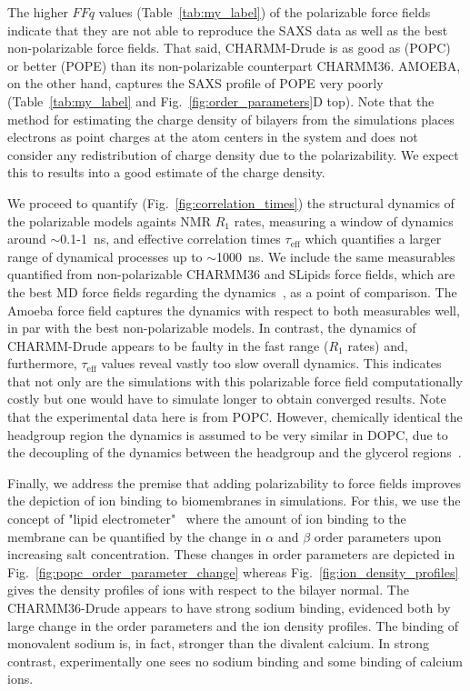 \documentclass[journal=jacsat,manuscript=article,layout=singlecolumn]{achemso}
\begin{document}
The higher $FFq$ values (Table~\ref{tab:my_label}) of the polarizable force fields indicate that they are not able to reproduce the SAXS data as well as the best non-polarizable force fields. That said, CHARMM-Drude is as good as (POPC) or better (POPE) than its non-polarizable counterpart CHARMM36. AMOEBA, on the other hand, captures the SAXS profile of POPE very poorly (Table~\ref{tab:my_label} and Fig.~\ref{fig:order_parameters}D top). Note that the method for estimating the charge density of bilayers from the simulations places electrons as point charges at the atom centers in the system and does not consider any redistribution of charge density due to the polarizability. We expect this to results into a good estimate of the charge density.

We proceed to quantify (Fig.~\ref{fig:correlation_times}) the structural dynamics of the polarizable models againts NMR $R_{1}$ rates, measuring a window of dynamics around $\sim$0.1-1~ns, and effective correlation times $\tau_{\mathrm{eff}}$ which quantifies a larger range of dynamical processes up to $\sim$1000~ns. We include the same measurables quantified from non-polarizable CHARMM36 and SLipids force fields, which are the best MD force fields regarding the dynamics~\cite{Antila2021}, as a point of comparison. The Amoeba force field captures the dynamics with respect to both measurables well,  in par with the best non-polarizable models. In contrast, the dynamics of CHARMM-Drude appears to be faulty in the fast range ($R_{1}$ rates) and, furthermore, $\tau_{\mathrm{eff}}$ values reveal vastly too slow overall dynamics. This indicates that not only are the simulations with this polarizable force field computationally costly but one would have to simulate longer to obtain converged results. Note that the experimental data here is from POPC. However, chemically identical the headgroup region the dynamics is assumed to be very similar in DOPC, due to the decoupling of the dynamics between the headgroup and the glycerol regions~\cite{Antila2022rot, Klauda08}.

Finally, we address the premise that adding polarizability to force fields improves the depiction of ion binding to biomembranes in simulations. For this, we use the concept of "lipid electrometer"~\cite{Catte2016} where the amount of ion binding to the membrane can be quantified by the change in $\alpha$ and $\beta$ order parameters upon increasing salt concentration. These changes in order parameters are depicted in Fig.~\ref{fig:popc_order_parameter_change} whereas Fig.~\ref{fig:ion_density_profiles} gives the density profiles of ions with respect to the bilayer normal. The CHARMM36-Drude appears to have strong sodium binding, evidenced both by large change in the order parameters and the ion density profiles. The binding of monovalent sodium is, in fact, stronger than the divalent calcium. In strong contrast, experimentally one sees no sodium binding and some binding of calcium ions. 
\end{document}
